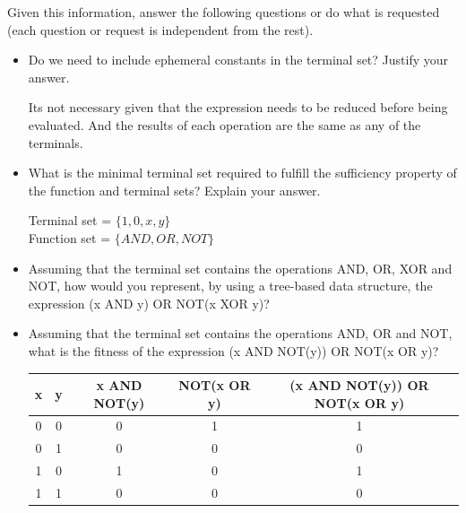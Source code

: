 \documentclass{article}
\begin{document}
Given this information, answer the following questions or do what is requested (each question or request is independent from the rest).
\begin{itemize}
    \item Do we need to include ephemeral constants in the terminal set? Justify your answer.

    Its not necessary given that the expression needs to be reduced before being evaluated. And the results of each operation are the same as any of the terminals.

    \item What is the minimal terminal set required to fulfill the sufficiency property of the function and terminal sets? Explain your answer.

    Terminal set = $\{1, 0, x, y\}$\\
    Function set = $\{AND, OR, NOT\}$

    \item Assuming that the terminal set contains the operations AND, OR, XOR and NOT, how would you represent, by using a tree-based data structure, the expression (x AND y) OR NOT(x XOR y)?

    \begin{center}
    \end{center}

    \item Assuming that the terminal set contains the operations AND, OR and NOT, what is the fitness of the expression (x AND NOT(y)) OR NOT(x OR y)?

    \begin{table}[h]
        \centering
        \begin{tabular}{c|c|c|c|c}
            x & y & x AND NOT(y) & NOT(x OR y) & (x AND NOT(y)) OR NOT(x OR y)\\
            \hline
            0 & 0 & 0 & 1 & 1 \\
            0 & 1 & 0 & 0 & 0 \\
            1 & 0 & 1 & 0 & 1 \\
            1 & 1 & 0 & 0 & 0 \\
        \end{tabular}
    \end{table}


\end{itemize}
\end{document}
